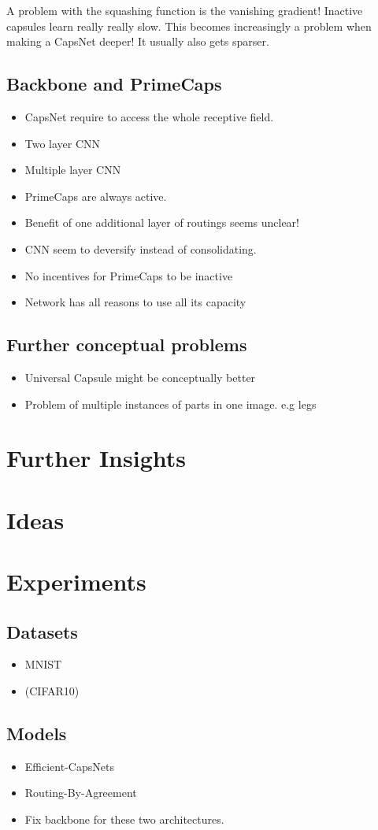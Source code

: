 \documentclass{article}
\begin{document}
A problem with the squashing function is the vanishing gradient!
Inactive capsules learn really really slow. This becomes increasingly a problem when making a CapsNet deeper! It usually also gets sparser.

\subsection{Backbone and PrimeCaps}
\begin{itemize}
	\item CapsNet require to access the whole receptive field.
	\item Two layer CNN
	\item Multiple layer CNN
	\item PrimeCaps are always active.
	\item Benefit of one additional layer of routings seems unclear!
	\item CNN seem to deversify instead of consolidating.
	\item No incentives for PrimeCaps to be inactive
	\item Network has all reasons to use all its capacity
\end{itemize}

\subsection{Further conceptual problems}
\begin{itemize}
	\item Universal Capsule might be conceptually better
	\item Problem of multiple instances of parts in one image. e.g legs
\end{itemize}

\section{Further Insights}


\section{Ideas}

\section{Experiments}
\subsection{Datasets}
\begin{itemize}
	\item MNIST
	\item (CIFAR10)
\end{itemize}

\subsection{Models}
\begin{itemize}
	\item Efficient-CapsNets
	\item Routing-By-Agreement
	\item Fix backbone for these two architectures.
\end{itemize}


%


\end{document}
